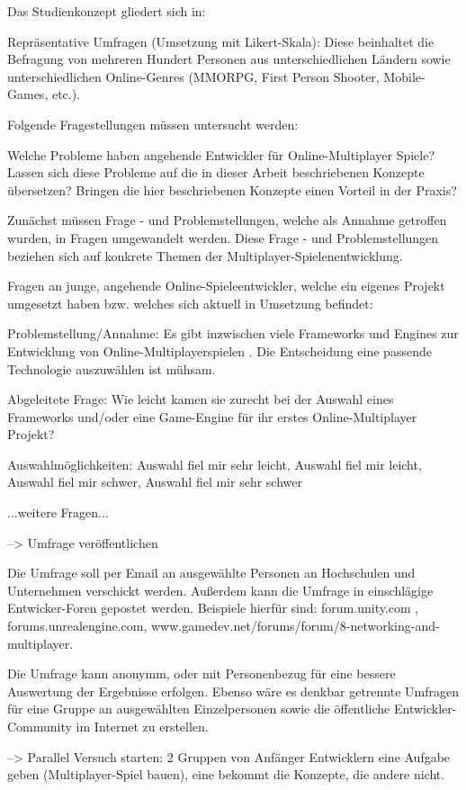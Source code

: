 Das Studienkonzept gliedert sich in:

Repräsentative Umfragen (Umsetzung mit Likert-Skala):
Diese beinhaltet die Befragung von mehreren Hundert Personen aus unterschiedlichen Ländern sowie unterschiedlichen Online-Genres (MMORPG, First Person Shooter, Mobile-Games, etc.).

Folgende Fragestellungen müssen untersucht werden:

Welche Probleme haben angehende Entwickler für Online-Multiplayer Spiele?
Lassen sich diese Probleme auf die in dieser Arbeit beschriebenen Konzepte übersetzen?
Bringen die hier beschriebenen Konzepte einen Vorteil in der Praxis?
	
Zunächst müssen Frage - und Problemstellungen, welche als Annahme getroffen wurden, in Fragen umgewandelt werden. Diese Frage - und Problemstellungen beziehen sich auf konkrete Themen der Multiplayer-Spielenentwicklung.
	
Fragen an junge, angehende Online-Spieleentwickler, welche ein eigenes Projekt umgesetzt haben bzw. welches sich aktuell in Umsetzung befindet:

Problemstellung/Annahme: Es gibt inzwischen viele Frameworks und Engines zur Entwicklung von Online-Multiplayerspielen \cite{MFatihMAR.2021}. Die Entscheidung eine passende Technologie auszuwählen ist mühsam.

Abgeleitete Frage: Wie leicht kamen sie zurecht bei der Auswahl eines Frameworks und/oder eine Game-Engine für ihr erstes Online-Multiplayer Projekt?

Auswahlmöglichkeiten: Auswahl fiel mir sehr leicht, Auswahl fiel mir leicht, Auswahl fiel mir schwer, Auswahl fiel mir sehr schwer

...weitere Fragen...

	--> Umfrage veröffentlichen
	
Die Umfrage soll per Email an ausgewählte Personen an Hochschulen und Unternehmen verschickt werden. Außerdem kann die Umfrage in einschlägige Entwicker-Foren gepostet werden. Beispiele hierfür sind: forum.unity.com , forums.unrealengine.com, www.gamedev.net/forums/forum/8-networking-and-multiplayer.

Die Umfrage kann anonymm, oder mit Personenbezug für eine bessere Auswertung der Ergebnisse erfolgen. Ebenso wäre es denkbar getrennte Umfragen für eine Gruppe an ausgewählten Einzelpersonen sowie die öffentliche Entwickler-Community im Internet zu erstellen.
	
	--> Parallel Versuch starten: 2 Gruppen von Anfänger Entwicklern eine Aufgabe geben (Multiplayer-Spiel bauen), eine bekommt die Konzepte, die andere nicht.
	
